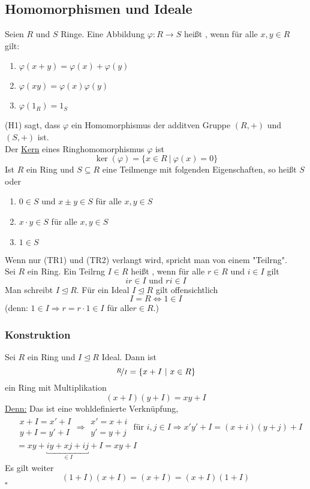 \subsection{Homomorphismen und Ideale}
\label{sub:homomor_ideale}
Seien $R$ und $S$ Ringe. Eine Abbildung $\varphi:R\to S$ heißt , wenn für alle $x,y\in R$ gilt:
\begin{enumerate}[(H1)]
	\item $\varphi(x+y)=\varphi(x)+\varphi(y)$
	\item $\varphi(xy)=\varphi(x)\varphi(y)$
	\item $\varphi(1_R)=1_S$
\end{enumerate}
(H1) sagt, dass $\varphi$ ein Homomorphismus der additven Gruppe $(R,+)$ und $(S,+)$ ist.\\
Der \uline{Kern} eines Ringhomomorphismus $\varphi$ ist
\[
\ker(\varphi)=\{x\in R~|~\varphi(x)=0 \}
\]
Ist $R$ ein Ring und $S\subseteq R$ eine Teilmenge mit folgenden Eigenschaften, so heißt $S$  oder 
\begin{enumerate}[(TR1)]
	\item $0\in S$ und $x\pm y\in S$ für alle $x,y\in S$
	\item $x\cdot y\in S$ für alle $x,y\in S$
	\item $1\in S$
\end{enumerate}
Wenn nur (TR1) und (TR2) verlangt wird, spricht man von einem "Teilrng".\\
Sei $R$ ein Ring. Ein Teilrng $I\in R$ heißt , wenn für alle $r\in R$ und $i\in I$ gilt
\[
ir\in I \text{ und } ri\in I
\]
Man schreibt $I\trianglelefteq R$.
Für ein Ideal $I\trianglelefteq R$ gilt offensichtlich
\[
I=R\Leftrightarrow 1\in I
\]
(denn: $1\in I\Rightarrow r=r\cdot 1\in I$ für alle$r\in R$.)

\subsubsection*{Konstruktion}
Sei $R$ ein Ring und $I\trianglelefteq R$ Ideal. Dann ist 
\[
\nicefrac{R}{I}=\{x+I~|~x\in R\}
\]
ein Ring mit Multiplikation
\[
(x+I)(y+I)=xy+I
\]
\uline{Denn:} Das ist eine wohldefinierte Verknüpfung,\\
\begin{equation*}
\begin{aligned}
&\begin{array}{c} x+I=x'+I\\ y+I=y'+I    \end{array} \Rightarrow \begin{array}{c} x'=x+i\\y'=y+j \end{array} \text{ für } i,j\in I \Rightarrow x'y'+I=(x+i)(y+j)+I\\
&= xy+\underbracket{iy+xj+ij}_{\in I}+I=xy+I
\end{aligned}
\end{equation*}
Es gilt weiter
\[
(1+I)(x+I)=(x+I)=(x+I)(1+I)
\]
\hfill $\square$

